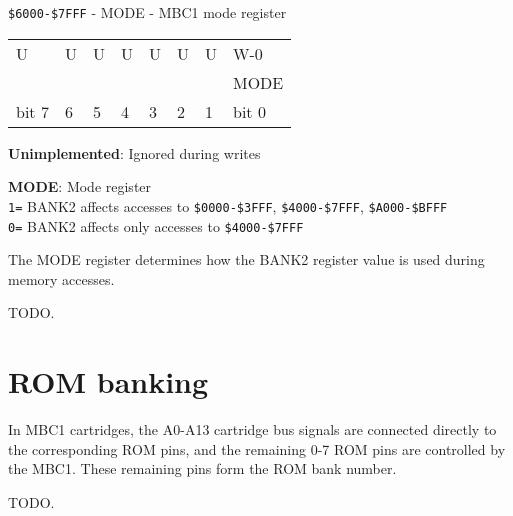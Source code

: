 \begin{register}
  \caption{\texttt{\$6000-\$7FFF} - MODE - MBC1 mode register}

  \begin{tabu} to \textwidth {|X[c]|X[c]|X[c]|X[c]|X[c]|X[c]|X[c]|X[c]|}
    \everyrow{\hline}
    \hline
    U                     & U                     & U                     & U                           & U & U & U & W-0   \\
     &  &  &  &  &  &  & MODE \\
    \rowfont{\small}
    bit 7                 & 6                     & 5                     & 4                              & 3   & 2   & 1   & bit 0 \\
    \hline
  \end{tabu}

  \begin{description}[leftmargin=5em, style=nextline]
    \item[bit 7-1]
      \textbf{Unimplemented}: Ignored during writes
    \item[bit 0]
      \textbf{MODE}: Mode register \\
      \texttt{1=} BANK2 affects accesses to \texttt{\$0000-\$3FFF}, \texttt{\$4000-\$7FFF}, \texttt{\$A000-\$BFFF} \\
      \texttt{0=} BANK2 affects only accesses to \texttt{\$4000-\$7FFF} \\
  \end{description}
\end{register}

The MODE register determines how the BANK2 register value is used during memory
accesses.

TODO.

\section{ROM banking}

In MBC1 cartridges, the A0-A13 cartridge bus signals are connected directly to
the corresponding ROM pins, and the remaining 0-7 ROM pins are controlled by
the MBC1. These remaining pins form the ROM bank number.

TODO.

